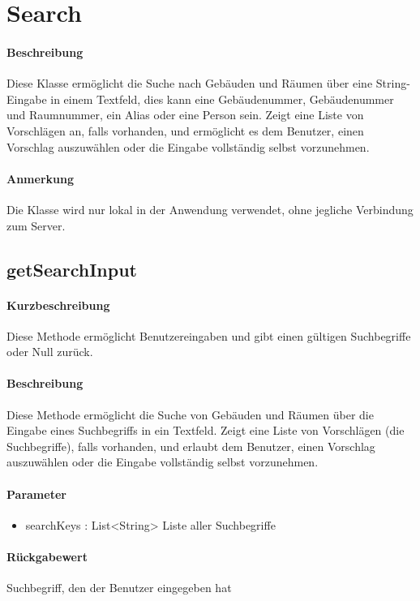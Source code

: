 \section{Search}
\paragraph*{Beschreibung}
Diese Klasse ermöglicht die Suche nach Gebäuden und Räumen über eine String-Eingabe in einem Textfeld, 
dies kann eine Gebäudenummer, Gebäudenummer und Raumnummer, ein Alias oder eine Person sein.
Zeigt eine Liste von Vorschlägen an, falls vorhanden, und ermöglicht es dem Benutzer, einen Vorschlag auszuwählen oder die Eingabe vollständig selbst vorzunehmen.
\paragraph*{Anmerkung}
Die Klasse wird nur lokal in der Anwendung verwendet, ohne jegliche Verbindung zum Server.

\subsection{getSearchInput}%
\paragraph*{Kurzbeschreibung}
Diese Methode ermöglicht Benutzereingaben und gibt einen gültigen Suchbegriffe oder Null zurück.
\paragraph*{Beschreibung}
Diese Methode ermöglicht die Suche von Gebäuden und Räumen über die Eingabe eines Suchbegriffs in ein Textfeld.
Zeigt eine Liste von Vorschlägen (die Suchbegriffe), falls vorhanden, und erlaubt dem Benutzer, einen Vorschlag auszuwählen oder die Eingabe vollständig selbst vorzunehmen.
\paragraph*{Parameter}
\begin{itemize}
    \item searchKeys : List<String> Liste aller Suchbegriffe
\end{itemize}
\paragraph*{Rückgabewert}
Suchbegriff, den der Benutzer eingegeben hat
